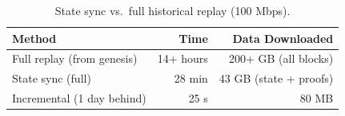 \begin{table}[H]
\centering
\caption{State sync vs.\ full historical replay (100 Mbps).}
\label{tab:vs_replay}
\begin{tabular}{lrr}
\toprule
\textbf{Method} & \textbf{Time} & \textbf{Data Downloaded} \\
\midrule
Full replay (from genesis) & 14+ hours & 200+ GB (all blocks) \\
State sync (full) & 28 min & 43 GB (state + proofs) \\
Incremental (1 day behind) & 25 s & 80 MB \\
\bottomrule
\end{tabular}
\end{table}

